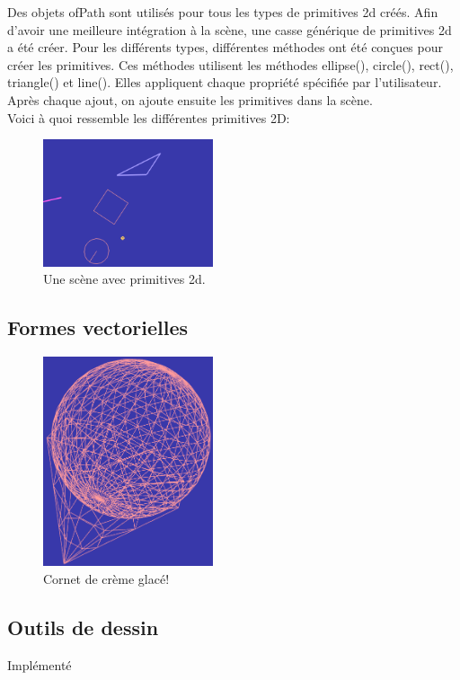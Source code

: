 Des objets ofPath sont utilisés pour tous les types de primitives 2d créés. Afin d’avoir une meilleure intégration à la scène, une casse générique de primitives 2d a été créer. Pour les différents types, différentes méthodes ont été conçues pour créer les primitives. Ces méthodes utilisent les méthodes ellipse(), circle(), rect(), triangle() et line(). Elles appliquent chaque propriété spécifiée par l’utilisateur. Après chaque ajout, on ajoute ensuite les primitives dans la scène.\\

Voici à quoi ressemble les différentes primitives 2D:\\
\begin{figure}[h]
	\centering
	\includegraphics[width=5cm]{fig/primitives2d.png}
	\caption{Une scène avec primitives 2d.}
	\label{fig:prim2d}
\end{figure}

\subsection{Formes vectorielles}

\begin{figure}[h]
	\centering
	\includegraphics[width=5cm]{fig/iceCream.png}
	\caption{Cornet de crème glacé!}
	\label{fig:iceCream}
\end{figure}

\subsection{Outils de dessin}
Implémenté

